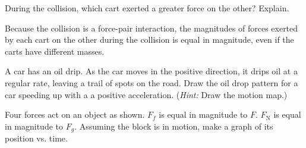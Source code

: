\documentclass[answers]{exam}
\begin{document}
\begin{questions}
During the collision, which cart exerted a greater force on the other? Explain.

\ifprintanswers
\else
\fillwithlines{2cm}
\fi

\begin{solution}
    Because the collision is a force-pair interaction, the magnitudes of forces exerted by each cart on the other during the collision is equal in magnitude, even if the carts have different masses.
\end{solution}


\question
A car has an oil drip. As the car moves in the positive direction, it drips oil at a regular rate, leaving a trail of spots on the road. Draw the oil drop pattern for a car speeding up with a a positive acceleration. (\textit{Hint:} Draw the motion map.)

\begin{center}
\end{center}

\question
Four forces act on an object as shown. $F_f$ is equal in magnitude to $F$. $F_\mathrm{N}$ is equal in magnitude to $F_g$. 
Assuming the block is in motion, make a graph of its position vs. time.


\begin{center}
\hspace{1cm}
\end{center}







\end{questions}
\end{document}
